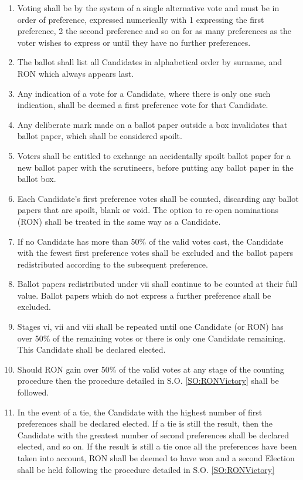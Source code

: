 \begin{enumerate}
\item Voting shall be by the system of a single alternative vote and must be in order of preference, expressed numerically with 1 expressing the first preference, 2 the second preference and so on for as many preferences as the voter wishes to express or until they have no further preferences.
\item The ballot shall list all Candidates in alphabetical order by surname, and RON which always appears last.
\item Any indication of a vote for a Candidate, where there is only one such indication, shall be deemed a first preference vote for that Candidate.
\item Any deliberate mark made on a ballot paper outside a box invalidates that ballot paper, which shall be considered spoilt.
\item Voters shall be entitled to exchange an accidentally spoilt ballot paper for a new ballot paper with the scrutineers, before putting any ballot paper in the ballot box.
\item Each Candidate's first preference votes shall be counted, discarding any ballot papers that are spoilt, blank or void. The option to re-open nominations (RON) shall be treated in the same way as a Candidate.
\item If no Candidate has more than 50\% of the valid votes cast, the Candidate with the fewest first preference votes shall be excluded and the ballot papers redistributed according to the subsequent preference.
\item Ballot papers redistributed under vii shall continue to be counted at their full value. Ballot papers which do not express a further preference shall be excluded.
\item Stages vi, vii and viii shall be repeated until one Candidate (or RON) has over 50\% of the remaining votes or there is only one Candidate remaining. This Candidate shall be declared elected.
\item Should RON gain over 50\% of the valid votes at any stage of the counting procedure then the procedure detailed in S.O. \ref{SO:RONVictory} shall be followed.
\item In the event of a tie, the Candidate with the highest number of first preferences shall be declared elected. If a tie is still the result, then the Candidate with the greatest number of second preferences shall be declared elected, and so on. If the result is still a tie once all the preferences have been taken into account, RON shall be deemed to have won and a second Election shall be held following the procedure detailed in S.O. \ref{SO:RONVictory}
\end{enumerate}
